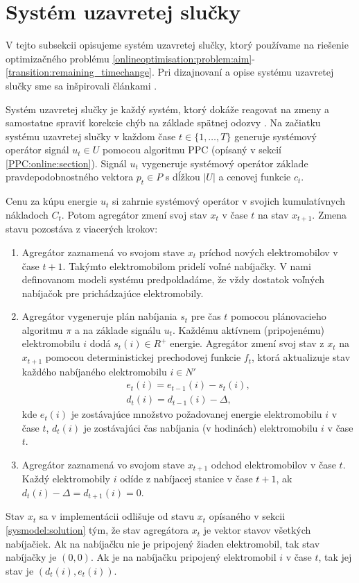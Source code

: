 \section{Systém uzavretej slučky}
\label{closed-loop-system:section}
V tejto subsekcii opisujeme systém uzavretej slučky, ktorý používame na riešenie optimizačného problému \eqref{onlineoptimisation:problem:aim}-\eqref{transition:remaining_timechange}. Pri dizajnovaní a opise systému uzavretej slučky sme sa inšpirovali článkami \cite{Li_information_aggregation,Li_2021}. 

Systém uzavretej slučky je každý systém, ktorý dokáže reagovat na zmeny a samostatne spraviť korekcie chýb na základe spätnej odozvy \cite{closed-and-open-loop}. Na začiatku systému uzavretej slučky v každom čase $t \in \{1, \dots, T\}$ generuje systémový operátor signál $u_{t} \in U$ pomocou algoritmu PPC (opísaný v sekcií \ref{PPC:online:section}). Signál $u_{t}$ vygeneruje systémový operátor základe pravdepodobnostného vektora $p_{t} \in P$ s dĺžkou $|U|$ a cenovej funkcie $c_{t}$.


Cenu za kúpu energie $u_{t}$ si zahrnie systémový operátor v svojich kumulatívnych nákladoch $C_{t}$. Potom agregátor
 zmení svoj stav $x_{t}$ v čase $t$ na stav $x_{t + 1}$. Zmena stavu pozostáva z viacerých krokov:
\begin{enumerate}
    \item Agregátor zaznamená vo svojom stave $x_{t}$ príchod nových elektromobilov v čase $t + 1$. Takýmto elektromobilom pridelí voľné nabíjačky. V nami definovanom modeli systému predpokladáme, že vždy dostatok voľných nabíjačok pre prichádzajúce elektromobily. 
    \item Agregátor vygeneruje plán nabíjania $s_{t}$ pre čas $t$ pomocou plánovacieho algoritmu $\pi$ a na základe signálu $u_{t}$. Každému aktívnem (pripojenému) elektromobilu $i$ dodá $s_{t}(i) \in R^{+}$ energie. Agregátor zmení svoj stav z $x_{t}$ na $x_{t + 1}$ pomocou deterministickej prechodovej funkcie $f_{t}$, ktorá aktualizuje stav každého nabíjaného elektromobilu $i \in N'$
    \begin{gather*}
        e_{t}(i) = e_{t - 1}(i) - s_{t}(i), \\
        d_{t}(i) = d_{t - 1}(i) - \Delta,
    \end{gather*}
    kde $e_{t}(i)$ je zostávajúce množstvo požadovanej energie elektromobilu $i$ v čase $t$, $d_{t}(i)$ je zostávajúci čas nabíjania (v hodinách) elektromobilu $i$ v čase $t$.
    \item Agregátor zaznamená vo svojom stave $x_{t + 1}$ odchod elektromobilov v čase $t$. Každý elektromobily $i$ odíde z nabíjacej stanice v čase $t + 1$, ak $d_{t}(i) - \Delta = d_{t + 1}(i) = 0$. 
\end{enumerate}
Stav $x_{t}$ sa v implementácii odlišuje od stavu $x_{t}$ opísaného v sekcii \ref{sysmodel:solution} tým, že stav agregátora $x_{t}$ je vektor stavov všetkých nabíjačiek. Ak na nabíjačku nie je pripojený žiaden elektromobil, tak stav nabíjačky je $(0,0)$. Ak je na nabíjačku pripojený elektromobil $i$ v čase $t$, tak jej stav je $(d_{t}(i), e_{t}(i))$.



